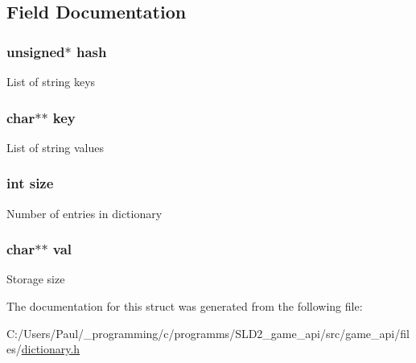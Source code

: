 \subsection{Field Documentation}
\hypertarget{struct__dictionary___a94cbe0bcb2d50b793bf7898ff983cf6f}{
\subsubsection[{hash}]{\setlength{\rightskip}{0pt plus 5cm}unsigned$\ast$ hash}}\label{struct__dictionary___a94cbe0bcb2d50b793bf7898ff983cf6f}
List of string keys \hypertarget{struct__dictionary___aa94bfa291123e0b5a87aa7c325cb0f25}{
\subsubsection[{key}]{\setlength{\rightskip}{0pt plus 5cm}char$\ast$$\ast$ key}}\label{struct__dictionary___aa94bfa291123e0b5a87aa7c325cb0f25}
List of string values \hypertarget{struct__dictionary___a439227feff9d7f55384e8780cfc2eb82}{
\subsubsection[{size}]{\setlength{\rightskip}{0pt plus 5cm}int size}}\label{struct__dictionary___a439227feff9d7f55384e8780cfc2eb82}
Number of entries in dictionary \hypertarget{struct__dictionary___ab972d3fdb3fb429976ac7b7d7c4b8d00}{
\subsubsection[{val}]{\setlength{\rightskip}{0pt plus 5cm}char$\ast$$\ast$ val}}\label{struct__dictionary___ab972d3fdb3fb429976ac7b7d7c4b8d00}
Storage size 

The documentation for this struct was generated from the following file\+:\begin{DoxyCompactItemize}
\item 
C\+:/\+Users/\+Paul/\+\_\+programming/c/programms/\+S\+L\+D2\+\_\+game\+\_\+api/src/game\+\_\+api/files/\hyperlink{dictionary_8h}{dictionary.\+h}\end{DoxyCompactItemize}
